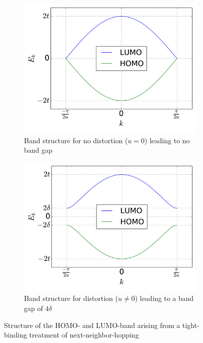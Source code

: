\begin{figure}
	\centering
	\begin{subfigure}{0.49\textwidth}
		\includegraphics[width =\textwidth]{Images/Plots/bandstructure_without_gap}
		\caption{Band structure for no distortion ($u = 0$) leading to no band gap}
		\label{image_bs_wo_gap}
	\end{subfigure}\hspace*{0.2cm}
	\begin{subfigure}{0.49\textwidth}
		\includegraphics[width = \textwidth]{Images/Plots/bandstructure_with_gap}
		\caption{Band structure for distortion ($u \neq 0$) leading to a band gap of $4\delta$}
		\label{image_bs_w_gap}
	\end{subfigure}
	\caption{Structure of the HOMO- and LUMO-band arising from a tight-binding treatment of next-neighbor-hopping}
	\label{images_bs}
\end{figure}
